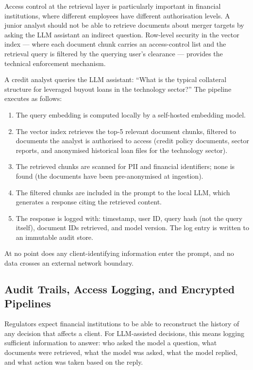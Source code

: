 Access control at the retrieval layer is particularly important in financial institutions, where different employees have different authorisation levels. A junior analyst should not be able to retrieve documents about merger targets by asking the LLM assistant an indirect question. Row-level security in the vector index — where each document chunk carries an access-control list and the retrieval query is filtered by the querying user's clearance — provides the technical enforcement mechanism.

\begin{example}
\label{ex:ch15-rag}
A credit analyst queries the LLM assistant: ``What is the typical collateral structure for leveraged buyout loans in the technology sector?'' The pipeline executes as follows:
\begin{enumerate}
  \item The query embedding is computed locally by a self-hosted embedding model.
  \item The vector index retrieves the top-5 relevant document chunks, filtered to documents the analyst is authorised to access (credit policy documents, sector reports, and anonymised historical loan files for the technology sector).
  \item The retrieved chunks are scanned for PII and financial identifiers; none is found (the documents have been pre-anonymised at ingestion).
  \item The filtered chunks are included in the prompt to the local LLM, which generates a response citing the retrieved content.
  \item The response is logged with: timestamp, user ID, query hash (not the query itself), document IDs retrieved, and model version. The log entry is written to an immutable audit store.
\end{enumerate}
At no point does any client-identifying information enter the prompt, and no data crosses an external network boundary.
\end{example}

\subsection{Audit Trails, Access Logging, and Encrypted Pipelines}
\label{sec:ch15-audit}

Regulators expect financial institutions to be able to reconstruct the history of any decision that affects a client. For LLM-assisted decisions, this means logging sufficient information to answer: who asked the model a question, what documents were retrieved, what the model was asked, what the model replied, and what action was taken based on the reply.

